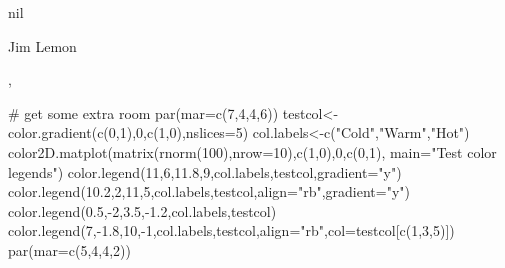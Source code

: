 \begin{Value}
nil
\end{Value}
\begin{Author}\relax
Jim Lemon
\end{Author}
\begin{SeeAlso}\relax
{}, 
\end{SeeAlso}
\begin{Examples}
\begin{ExampleCode}
 # get some extra room
 par(mar=c(7,4,4,6))
 testcol<-color.gradient(c(0,1),0,c(1,0),nslices=5)
 col.labels<-c("Cold","Warm","Hot")
 color2D.matplot(matrix(rnorm(100),nrow=10),c(1,0),0,c(0,1),
  main="Test color legends")
 color.legend(11,6,11.8,9,col.labels,testcol,gradient="y")
 color.legend(10.2,2,11,5,col.labels,testcol,align="rb",gradient="y")
 color.legend(0.5,-2,3.5,-1.2,col.labels,testcol)
 color.legend(7,-1.8,10,-1,col.labels,testcol,align="rb",col=testcol[c(1,3,5)])
 par(mar=c(5,4,4,2))
\end{ExampleCode}
\end{Examples}

